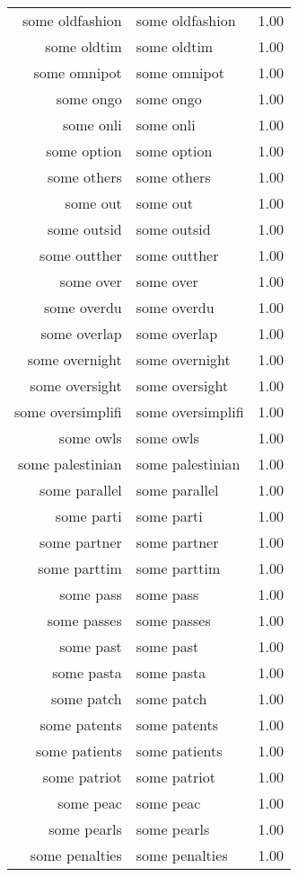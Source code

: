\begin{table}[ht]
\begin{tabular}{rlr}
  some oldfashion & some oldfashion & 1.00 \\ 
  some oldtim & some oldtim & 1.00 \\ 
  some omnipot & some omnipot & 1.00 \\ 
  some ongo & some ongo & 1.00 \\ 
  some onli & some onli & 1.00 \\ 
  some option & some option & 1.00 \\ 
  some others & some others & 1.00 \\ 
  some out & some out & 1.00 \\ 
  some outsid & some outsid & 1.00 \\ 
  some outther & some outther & 1.00 \\ 
  some over & some over & 1.00 \\ 
  some overdu & some overdu & 1.00 \\ 
  some overlap & some overlap & 1.00 \\ 
  some overnight & some overnight & 1.00 \\ 
  some oversight & some oversight & 1.00 \\ 
  some oversimplifi & some oversimplifi & 1.00 \\ 
  some owls & some owls & 1.00 \\ 
  some palestinian & some palestinian & 1.00 \\ 
  some parallel & some parallel & 1.00 \\ 
  some parti & some parti & 1.00 \\ 
  some partner & some partner & 1.00 \\ 
  some parttim & some parttim & 1.00 \\ 
  some pass & some pass & 1.00 \\ 
  some passes & some passes & 1.00 \\ 
  some past & some past & 1.00 \\ 
  some pasta & some pasta & 1.00 \\ 
  some patch & some patch & 1.00 \\ 
  some patents & some patents & 1.00 \\ 
  some patients & some patients & 1.00 \\ 
  some patriot & some patriot & 1.00 \\ 
  some peac & some peac & 1.00 \\ 
  some pearls & some pearls & 1.00 \\ 
  some penalties & some penalties & 1.00 \\ 

\end{tabular}
\end{table}
